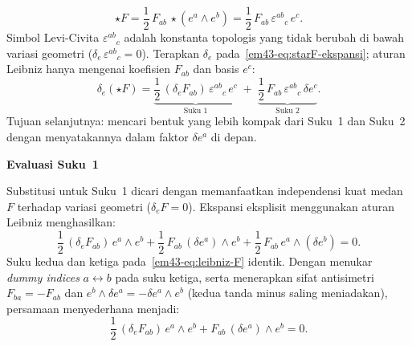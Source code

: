 \begin{equation}\label{em43-eq:starF-ekspansi}
    \star F
    = \frac{1}{2}\, F_{ab}\, \star(e^{a} \wedge e^{b})
    = \frac{1}{2}\, F_{ab}\, \varepsilon^{ab}{}_{c}\, e^{c}.
\end{equation}
Simbol Levi-Civita $\varepsilon^{ab}{}_{c}$ adalah konstanta topologis yang tidak berubah di bawah variasi geometri ($\delta_{e}\, \varepsilon^{ab}{}_{c} = 0$). Terapkan $\delta_{e}$ pada~\eqref{em43-eq:starF-ekspansi}; aturan Leibniz hanya mengenai koefisien $F_{ab}$ dan basis $e^{c}$:
\begin{equation}\label{em43-eq:persamaan-utama}
    \delta_{e}(\star F)
    = \underbrace{\frac{1}{2}\, (\delta_{e} F_{ab})\,
    \varepsilon^{ab}{}_{c}\, e^{c}}_{\text{Suku 1}}
    \;+\;
    \underbrace{\frac{1}{2}\, F_{ab}\,
    \varepsilon^{ab}{}_{c}\, \delta e^{c}}_{\text{Suku 2}}.
\end{equation}
Tujuan selanjutnya: mencari bentuk yang lebih kompak dari Suku~1 dan Suku~2 dengan menyatakannya dalam faktor $\delta e^a$ di depan.

\vspace{0.5em}
\noindent \textbf{Evaluasi Suku~1}

Substitusi untuk Suku~1 dicari dengan memanfaatkan independensi kuat medan $F$ terhadap variasi geometri ($\delta_{e} F = 0$). Ekspansi eksplisit menggunakan aturan Leibniz menghasilkan:
\begin{equation}\label{em43-eq:leibniz-F}
    \frac{1}{2}\, (\delta_{e} F_{ab})\, e^{a} \wedge e^{b}
    + \frac{1}{2}\, F_{ab}\, (\delta e^{a}) \wedge e^{b}
    + \frac{1}{2}\, F_{ab}\, e^{a} \wedge (\delta e^{b})
    = 0.
\end{equation}
Suku kedua dan ketiga pada~\eqref{em43-eq:leibniz-F} identik. Dengan menukar \emph{dummy indices} $a \leftrightarrow b$ pada suku ketiga, serta menerapkan sifat antisimetri $F_{ba} = -F_{ab}$ dan $e^{b} \wedge \delta e^{a} = -\delta e^{a} \wedge e^{b}$ (kedua tanda minus saling meniadakan), persamaan menyederhana menjadi:
\begin{equation}\label{em43-eq:var-F-compact}
    \frac{1}{2}\, (\delta_{e} F_{ab})\, e^{a} \wedge e^{b}
    + F_{ab}\, (\delta e^{a}) \wedge e^{b} = 0.
\end{equation}

